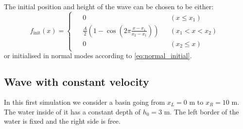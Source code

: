 The initial position and height of the wave can be chosen to be either:
\begin{equation}
    f_\textrm{init}(x) = \begin{cases}
        \begin{aligned}
            &0 &&(x \le x_1)\\
            & {\frac{A}{2} \left( 1 - \cos \left( 2\pi\frac{x-x_1}{x_2-x_1} \right) \right)} &&(x_1 < x < x_2)\\
            &0 &&(x_2 \le x)
        \end{aligned}
    \end{cases}
    \label{eq:form_init}
\end{equation}
or initialised in normal modes according to \autoref{eq:normal_initial}.




\subsection{Wave with constant velocity}
In this first simulation we consider a basin going from $x_L = 0$ \si{\meter} to $x_R = 10$ \si{\meter}. The water inside of it has a constant depth of $h_0 = 3$ \si{\meter}. The left border of the water is fixed and the right side is free. 

